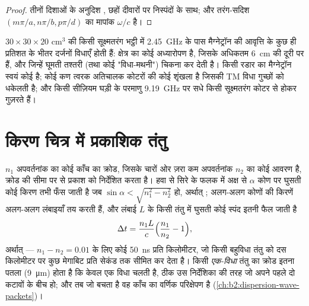 \begin{proof}
तीनों दिशाओं के अनुदिश , छहों दीवारों पर निस्पंदों के साथ;
और तरंग-सदिश $(m\pi/a, n\pi/b, p\pi/d)$ का मापांक $\omega/c$ है।
\end{proof}

\begin{example}[भट्ठियाँ, रडार, घड़ियाँ]\label{ex:b2:guided-waves:cavities}
$30 \times 30 \times 20$ cm$^3$ की किसी सूक्ष्मतरंग भट्ठी में \qty{2.45}{GHz} के पास
मैग्नेट्रॉन की आवृत्ति के कुछ ही प्रतिशत के भीतर दर्जनों विधाएँ होती हैं:
क्षेत्र  का कोई अध्यारोपण है, जिसके अधिकतम
\qty{6}{cm} की दूरी पर हैं, और जिन्हें घूमती तश्तरी (तथा कोई "विधा-मथनी")
चिकना कर देती है। किसी रडार का मैग्नेट्रॉन स्वयं कोई  है; कोई कण
त्वरक अतिचालक कोटरों की कोई शृंखला है जिसकी TM विधा
गुच्छों को धकेलती है; और किसी सीज़ियम घड़ी के परमाणु \qty{9.19}{GHz} पर सधे
किसी सूक्ष्मतरंग कोटर से होकर गुज़रते हैं।
\end{example}

\section{किरण चित्र में प्रकाशिक तंतु}

\begin{proposition}[सोपान-अपवर्तनांक तंतु]\label{prop:b2:guided-waves:fibre}
$n_1$ अपवर्तनांक का कोई काँच का क्रोड, जिसके चारों ओर ज़रा कम अपवर्तनांक
$n_2$ का कोई आवरण है, क्रोड की सीमा पर  से प्रकाश को
निर्देशित करता है। हवा से सिरे के फलक में अक्ष से $\alpha$ कोण पर घुसती
कोई किरण तभी फँस जाती है जब $\sin\alpha < \sqrt{n_1^2 - n_2^2}$ हो, अर्थात्
\emph{}; अलग-अलग कोणों की किरणें अलग-अलग लंबाइयाँ तय करती हैं, और
लंबाई $L$ के किसी तंतु में घुसती कोई स्पंद इतनी फैल जाती है
\[
\Delta t = \frac{n_1L}c\Bigl(\frac{n_1}{n_2} - 1\Bigr) ,
\]
अर्थात् \emph{} --- $n_1
- n_2 = 0.01$ के लिए कोई \qty{50}{ns} प्रति किलोमीटर, जो किसी बहुविधा तंतु को
दस किलोमीटर पर कुछ मेगाबिट प्रति सेकंड तक सीमित कर देता है। किसी
\emph{एक-विधा} तंतु का क्रोड इतना पतला (\qty{9}{\micro m}) होता है कि केवल
एक विधा चलती है, ठीक उस निर्देशिका की तरह जो अपने पहले दो कटावों के बीच हो;
और तब जो बचता है वह काँच का वर्णिक परिक्षेपण है
(\cref{ch:b2:dispersion-wave-packets})।
\end{proposition}

